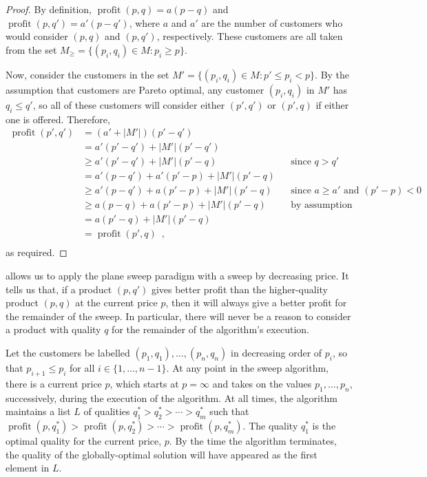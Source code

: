 \documentclass{llncs}
\newcommand{\val}{\operatorname{profit}}
\begin{document}
\begin{proof}
  By definition, $\val(p,q) = a(p-q)$ and $\val(p,q') = a'(p-q')$, where
  $a$ and $a'$ are the number of customers who would consider $(p,q)$
  and $(p,q')$, respectively.  These customers are all taken from the
  set $M_\ge =\{(p_i,q_i)\in M: p_i \ge p\}$.

  Now, consider the customers in the set $M'=\{(p_i,q_i)\in M: p' \le
  p_i < p\}$.  By the assumption that customers are Pareto optimal,
  any customer $(p_i,q_i)$ in $M'$ has $q_i \le q'$, so all of these
  customers will consider either $(p',q')$ or $(p',q)$ if either one
  is offered.  Therefore,
  \[
    \begin{aligned}
      \val(p',q')
        &  =   (a'+|M'|)(p'-q') \\
        &  =   a'(p'-q') + |M'|(p'-q') \\
        & \ge  a'(p'-q') + |M'|(p'-q) 
               && \mbox{since $q > q'$} \\
        &  =   a'(p-q') + a'(p'-p) + |M'|(p'-q) \\
        & \ge  a'(p-q') + a(p'-p) + |M'|(p'-q) 
               && \mbox{since $a \ge a'$ and $(p'-p) < 0$} \\
        & \ge  a(p-q) + a(p'-p) + |M'|(p'-q) 
               && \mbox{by assumption} \\
        &  =  a(p'-q) + |M'|(p'-q) \\
        &  =  \val(p',q) \enspace , \\
    \end{aligned}
  \]
  as required.
\end{proof}

 allows us to apply the plane sweep paradigm with a sweep
by decreasing price.  It tells us that, if a product $(p,q')$ gives better
profit than the higher-quality product $(p,q)$ at the current price $p$,
then it will always give a better profit for the remainder of the sweep.
In particular, there will never be a reason to consider a product with
quality $q$ for the remainder of the algorithm's execution.

Let the customers be labelled $(p_1,q_1),\ldots,(p_n,q_n)$ in decreasing
order of $p_i$, so that $p_{i+1} \le p_i$ for all $i\in\{1,\ldots,n-1\}$.
At any point in the sweep algorithm, there is a current price $p$, which
starts at $p=\infty$ and takes on the values $p_1,\ldots,p_n$,
successively, during the execution of the algorithm.  At all times, the
algorithm maintains a list $L$ of qualities $q_1^* > q_2^* > \cdots >
q_m^*$ such that $\val(p,q_1^*) > \val(p,q_2^*) >\cdots>\val(p,q_m^*)$.
The quality $q_1^*$ is the optimal quality for the current price, $p$.  By
the time the algorithm terminates, the quality of the globally-optimal
solution will have appeared as the first element in $L$.
\end{document}
